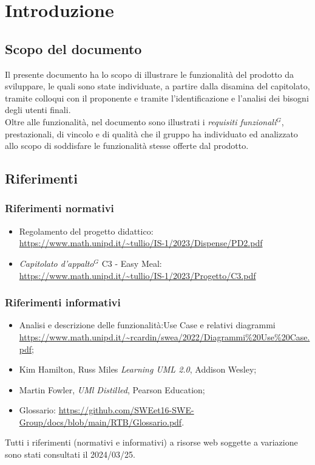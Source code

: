 
\section{Introduzione}

\subsection{Scopo del documento}

Il presente documento ha lo scopo di illustrare le funzionalità del prodotto da sviluppare,
le quali sono state individuate, a partire dalla disamina del capitolato, tramite colloqui con
il proponente e tramite l'identificazione e l'analisi dei bisogni degli utenti finali.\\
Oltre alle funzionalità, nel documento sono illustrati i \emph{requisiti funzionali}$^{G}$, prestazionali, di
vincolo e di qualità che il gruppo ha individuato ed analizzato allo scopo di soddisfare le
funzionalità stesse offerte dal prodotto.

\subsection{Riferimenti}
\subsubsection{Riferimenti normativi}

\begin{itemize}
    \item Regolamento del progetto didattico: \\
    \url{https://www.math.unipd.it/~tullio/IS-1/2023/Dispense/PD2.pdf}
  \item \emph{Capitolato d’appalto}$^{G}$ C3 - Easy Meal: \\
    \url{https://www.math.unipd.it/~tullio/IS-1/2023/Progetto/C3.pdf}
\end{itemize}

\subsubsection{Riferimenti informativi}

\begin{itemize}
    \item Analisi e descrizione delle funzionalità:Use Case e relativi diagrammi \url{https://www.math.unipd.it/~rcardin/swea/2022/Diagrammi%20Use%20Case.pdf};
    \item Kim Hamilton, Russ Miles \emph{Learning UML 2.0}, Addison Wesley;
    \item Martin Fowler, \emph{UMl Distilled}, Pearson Education;
    \item Glossario: \url{https://github.com/SWEet16-SWE-Group/docs/blob/main/RTB/Glossario.pdf}.
\end{itemize}

Tutti i riferimenti (normativi e informativi) a risorse web soggette a variazione sono stati consultati il 2024/03/25.
